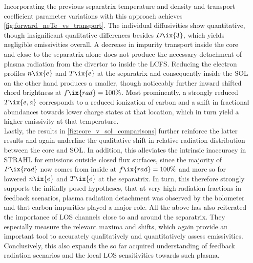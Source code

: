             Incorporating the previous separatrix temperature and density and transport coefficient parameter variations with this approach achieves \cref{fig:forward_neTe_vs_transport}. The individual diffusivities show quantitative, though insignificant qualitative differences besides $D\ix{3}$, which yields negligible emissivities overall. A decrease in impurity transport inside the core and close to the separatrix alone does not produce the necessary detachment of plasma radiation from the divertor to inside the LCFS. Reducing the electron profiles $n\ix{e}$ and $T\ix{e}$ at the separatrix and consequently inside the SOL on the other hand produces a smaller, though noticeably further inward shifted chord brightness at $f\ix{rad}=100\%$. Most prominently, a strongly reduced $T\ix{e,a}$ corresponds to a reduced ionization of carbon and a shift in fractional abundances towards lower charge states at that location, which in turn yield a higher emissivity at that temperature.\\%
            Lastly, the results in \cref{fig:core_v_sol_comparisons} further reinforce the latter results and again underline the qualitative shift in relative radiation distribution between the core and SOL. In addition, this alleviates the intrinsic inaccuracy in STRAHL for emissions outside closed flux surfaces, since the majority of $P\ix{rad}$ now comes from inside at $f\ix{rad}=100\%$ and more so for lowered $n\ix{e}$ and $T\ix{e}$ at the separatrix. In turn, this therefore strongly supports the initially posed hypotheses, that at very high radiation fractions in feedback scenarios, plasma radiation detachment was observed by the bolometer and that carbon impurities played a major role. All the above has also reiterated the importance of LOS channels close to and around the separatrix. They especially measure the relevant maxima and shifts, which again provide an important tool to accurately qualitatively and quantitatively assess emissivities. Conclusively, this also expands the so far acquired understanding of feedback radiation scenarios and the local LOS sensitivities towards such plasma.%
%
